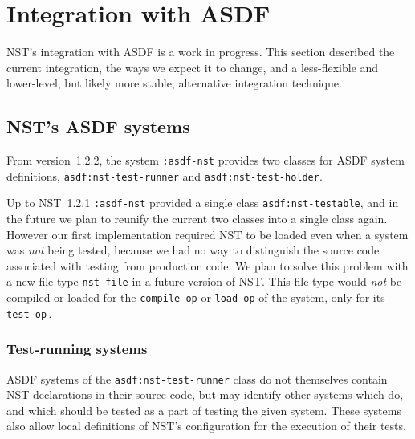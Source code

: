 \section{Integration with ASDF}
NST's integration with ASDF is a work in progress.  This section
described the current integration, the ways we expect it to change,
and a less-flexible and lower-level, but likely more stable,
alternative integration technique.

\subsection{NST's ASDF systems}
From version~1.2.2, the system \texttt{:asdf-nst} provides two classes
for ASDF system definitions, \texttt{asdf:nst-test-runner} and
\texttt{asdf:nst-test-holder}.

Up to NST~1.2.1 \texttt{:asdf-nst} provided a single class
\texttt{asdf:nst-testable}, and in the future we plan to reunify the
current two classes into a single class again.  However our first
implementation required NST to be loaded even when a system was
\emph{not} being tested, because we had no way to distinguish the
source code associated with testing from production code.  We plan to
solve this problem with a new file type \texttt{nst-file} in a future
version of NST.  This file type would \emph{not} be compiled or loaded
for the \texttt{compile-op} or \texttt{load-op} of the system, only
for its \texttt{test-op}\,.

\subsubsection{Test-running systems}
ASDF systems of the \texttt{asdf:nst-test-runner} class do not
themselves contain NST declarations in their source code, but may
identify other systems which do, and which should be tested as a part
of testing the given system.  These systems also allow local
definitions of NST's configuration for the execution of their tests.

